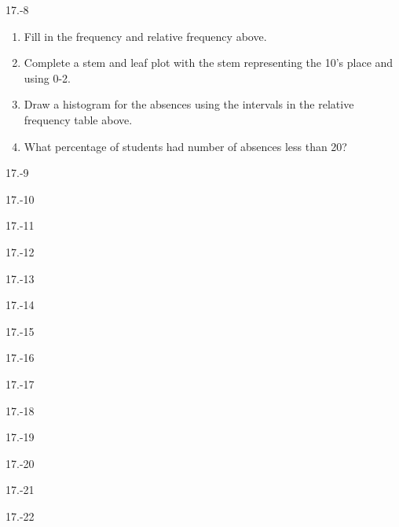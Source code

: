 \begin{exsol@solution}{17.-8}
\begin{enumerate}
  \item	Fill in the frequency and relative frequency above.
  \item	Complete a stem and leaf plot with the stem representing the 10's place and using 0-2.
  \item	Draw a histogram for the absences using the intervals in the relative frequency table above.
  \item	What percentage of students had number of absences less than 20?
\end{enumerate}

\end{exsol@solution}
\begin{exsol@solution}{17.-9}
\end{exsol@solution}
\begin{exsol@solution}{17.-10}
\end{exsol@solution}
\begin{exsol@solution}{17.-11}
\end{exsol@solution}
\begin{exsol@solution}{17.-12}
\end{exsol@solution}
\begin{exsol@solution}{17.-13}
\end{exsol@solution}
\begin{exsol@solution}{17.-14}
\end{exsol@solution}
\begin{exsol@solution}{17.-15}
\end{exsol@solution}
\begin{exsol@solution}{17.-16}
\end{exsol@solution}
\begin{exsol@solution}{17.-17}
\end{exsol@solution}
\begin{exsol@solution}{17.-18}
\end{exsol@solution}
\begin{exsol@solution}{17.-19}
\end{exsol@solution}
\begin{exsol@solution}{17.-20}
\end{exsol@solution}
\begin{exsol@solution}{17.-21}
\end{exsol@solution}
\begin{exsol@solution}{17.-22}
\end{exsol@solution}
